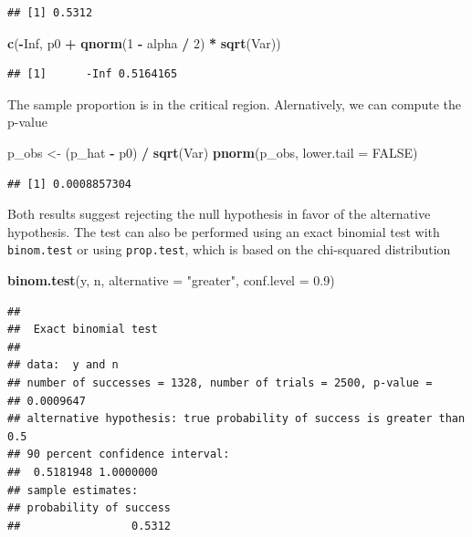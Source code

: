 \documentclass[
]{article}
\newenvironment{Shaded}{\begin{snugshade}}{\end{snugshade}}
\newcommand{\AttributeTok}[1]{\textcolor[rgb]{0.13,0.29,0.53}{#1}}
\newcommand{\ConstantTok}[1]{\textcolor[rgb]{0.56,0.35,0.01}{#1}}
\newcommand{\DecValTok}[1]{\textcolor[rgb]{0.00,0.00,0.81}{#1}}
\newcommand{\FloatTok}[1]{\textcolor[rgb]{0.00,0.00,0.81}{#1}}
\newcommand{\FunctionTok}[1]{\textcolor[rgb]{0.13,0.29,0.53}{\textbf{#1}}}
\newcommand{\NormalTok}[1]{#1}
\newcommand{\OtherTok}[1]{\textcolor[rgb]{0.56,0.35,0.01}{#1}}
\newcommand{\SpecialCharTok}[1]{\textcolor[rgb]{0.81,0.36,0.00}{\textbf{#1}}}
\newcommand{\StringTok}[1]{\textcolor[rgb]{0.31,0.60,0.02}{#1}}
\begin{document}
\begin{verbatim}
## [1] 0.5312
\end{verbatim}

\begin{Shaded}
\begin{Highlighting}[]
 \FunctionTok{c}\NormalTok{(}\SpecialCharTok{{-}}\ConstantTok{Inf}\NormalTok{, }
\NormalTok{  p0 }\SpecialCharTok{+} \FunctionTok{qnorm}\NormalTok{(}\DecValTok{1} \SpecialCharTok{{-}}\NormalTok{ alpha }\SpecialCharTok{/} \DecValTok{2}\NormalTok{) }\SpecialCharTok{*} \FunctionTok{sqrt}\NormalTok{(Var))}
\end{Highlighting}
\end{Shaded}

\begin{verbatim}
## [1]      -Inf 0.5164165
\end{verbatim}

The sample proportion is in the critical region. Alernatively, we can
compute the p-value

\begin{Shaded}
\begin{Highlighting}[]
\NormalTok{p\_obs }\OtherTok{\textless{}{-}}\NormalTok{ (p\_hat }\SpecialCharTok{{-}}\NormalTok{ p0) }\SpecialCharTok{/} \FunctionTok{sqrt}\NormalTok{(Var)}
\FunctionTok{pnorm}\NormalTok{(p\_obs, }\AttributeTok{lower.tail =} \ConstantTok{FALSE}\NormalTok{)}
\end{Highlighting}
\end{Shaded}

\begin{verbatim}
## [1] 0.0008857304
\end{verbatim}

Both results suggest rejecting the null hypothesis in favor of the
alternative hypothesis. The test can also be performed using an exact
binomial test with \texttt{binom.test} or using \texttt{prop.test},
which is based on the chi-squared distribution

\begin{Shaded}
\begin{Highlighting}[]
\FunctionTok{binom.test}\NormalTok{(y, n, }\AttributeTok{alternative =} \StringTok{"greater"}\NormalTok{, }\AttributeTok{conf.level =} \FloatTok{0.9}\NormalTok{)}
\end{Highlighting}
\end{Shaded}

\begin{verbatim}
## 
##  Exact binomial test
## 
## data:  y and n
## number of successes = 1328, number of trials = 2500, p-value =
## 0.0009647
## alternative hypothesis: true probability of success is greater than 0.5
## 90 percent confidence interval:
##  0.5181948 1.0000000
## sample estimates:
## probability of success 
##                 0.5312
\end{verbatim}
\end{document}
